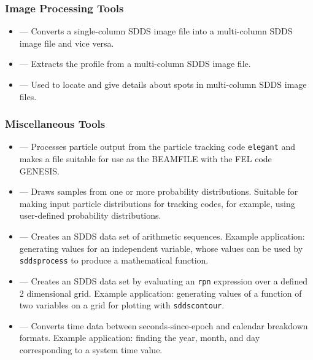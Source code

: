 \documentclass[11pt]{article}
\begin{document}
\subsubsection{Image Processing Tools}

\begin{itemize}

\item {} --- Converts a single-column SDDS image file into a multi-column SDDS image file and vice versa.

\item {} --- Extracts the profile from a multi-column SDDS image file.

\item {} --- Used to locate and give details about spots in multi-column SDDS image files.

\end{itemize}

\subsubsection{Miscellaneous Tools}

\begin{itemize}

\item {} --- Processes particle output from the particle tracking code
        \verb|elegant|\cite{elegant}
        and makes a file suitable for use as the BEAMFILE with the FEL code GENESIS\cite{GENESIS}.

\item {} --- Draws samples from one or more probability distributions.
        Suitable for making input particle distributions for tracking codes, for example, 
        using user-defined probability distributions.

\item {} --- Creates an SDDS data set of arithmetic sequences. 
Example application: generating values for an independent variable, whose values can be used by
{\tt sddsprocess} to produce a mathematical function.

\item {} --- Creates an SDDS data set by evaluating an \verb|rpn| expression over a defined 2
dimensional grid.  Example application: generating values of a function of two variables on a grid for plotting
with {\tt sddscontour}.

\item {} --- Converts time data between seconds-since-epoch and calendar breakdown formats.
Example application: finding the year, month, and day corresponding to a system time value.

\end{itemize}
\end{document}
